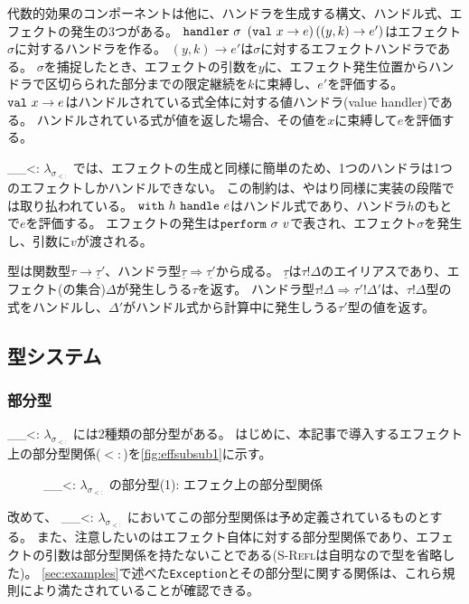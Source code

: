 \documentclass{ltjsarticle}
\def\effsub{
  \ifmmode
    \lambda_{\sigma_{<:}}
  \else
    $\lambda_{\sigma_{<:}}$
  \fi
}
\begin{document}
代数的効果のコンポーネントは他に、ハンドラを生成する構文、ハンドル式、エフェクトの発生の3つがある。
$\handlerK \sigma\ \left(\valK x \rightarrow e\right) \left(\left(y, k\right) \rightarrow e'\right)$はエフェクト$\sigma$に対するハンドラを作る。
$\left(y, k\right)\rightarrow e'$は$\sigma$に対するエフェクトハンドラである。
$\sigma$を捕捉したとき、エフェクトの引数を$y$に、エフェクト発生位置からハンドラで区切らられた部分までの限定継続を$k$に束縛し、$e'$を評価する。
$\valK x \rightarrow e$はハンドルされている式全体に対する値ハンドラ(value handler)である。
ハンドルされている式が値を返した場合、その値を$x$に束縛して$e$を評価する。
\effsub{}では、エフェクトの生成と同様に簡単のため、1つのハンドラは1つのエフェクトしかハンドルできない。
この制約は、やはり同様に実装の段階では取り払われている。
$\withK h\ \handleK e$はハンドル式であり、ハンドラ$h$のもとで$e$を評価する。
エフェクトの発生は$\performK \sigma\ v$で表され、エフェクト$\sigma$を発生し、引数に$v$が渡される。

型は関数型$\tau\rightarrow\underline{\tau}'$、ハンドラ型$\underline{\tau}\Rightarrow\underline{\tau'}$から成る。
$\underline{\tau}$は$\tau!\Delta$のエイリアスであり、エフェクト(の集合)$\Delta$が発生しうる$\tau$を返す。
ハンドラ型$\tau!\Delta \Rightarrow\tau'!\Delta'$は、$\tau!\Delta$型の式をハンドルし、$\Delta'$がハンドル式から計算中に発生しうる$\tau'$型の値を返す。

\subsection{型システム}
\subsubsection{部分型}
\effsub{}には2種類の部分型がある。
はじめに、本記事で導入するエフェクト上の部分型関係($<:$)を\autoref{fig:effsubsub1}に示す。
\begin{figure}[ht]
  \centering
  \begin{framed}
      \infax[S-Refl]{
        \sigma <: \sigma
      }

  \end{framed}
  \caption{\effsub{}の部分型(1): エフェク上の部分型関係}
  \label{fig:effsubsub1}
\end{figure}
改めて、\effsub{}においてこの部分型関係は予め定義されているものとする。
また、注意したいのはエフェクト自体に対する部分型関係であり、エフェクトの引数は部分型関係を持たないことである(\textsc{S-Refl}は自明なので型を省略した)。
\autoref{sec:examples}で述べた\texttt{Exception}とその部分型に関する関係は、これら規則により満たされていることが確認できる。
\end{document}
